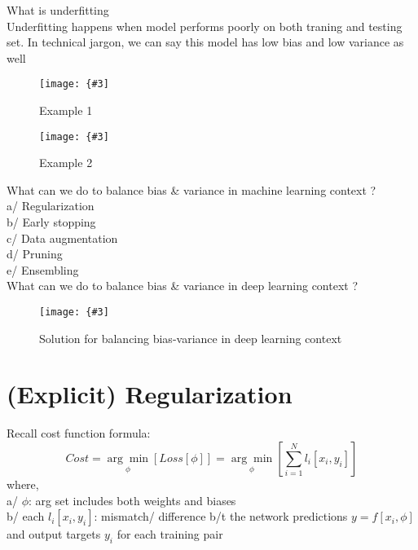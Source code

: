 \documentclass[12pt,a4paper]{article}
\newcommand{\img}[3]{
	\texttt{[image: \{\#3]}}}
\begin{document}
\noindent What is underfitting\\
\indent Underfitting happens when model performs poorly on both traning and testing set. In technical jargon, we can say this model has low bias and low variance as well\\
\begin{figure}[!h]
	\centering
	\begin{minipage}[h!]{0.4\textwidth}
		\img{\textwidth}{\textwidth}{Picture/Bias-Variance/2.png}
		\caption{Example 1}
	\end{minipage}
	\hfill
	\begin{minipage}[h!]{0.4\textwidth}
		\img{\textwidth}{\textwidth}{Picture/Bias-Variance/3.png}
		\caption{Example 2}
	\end{minipage}
\end{figure}
\newline
\noindent What can we do to balance bias \& variance in machine learning context ?\\
\indent a/ Regularization\\
\indent b/ Early stopping\\
\indent c/ Data augmentation\\
\indent d/ Pruning\\
\indent e/ Ensembling\\

\noindent What can we do to balance bias \& variance in deep learning context ?\\
\begin{figure}[h!]
\centering\img{4cm}{4cm}{Picture/Bias-Variance/4.jpg}
\caption{Solution for balancing bias-variance in deep learning context}
\end{figure}


\section{(Explicit) Regularization}
Recall cost function formula:
\begin{equation}
Cost = \underset{\phi}{\arg\min}[Loss[\phi]]
= \underset{\phi}{\arg\min}\left[\sum_{i=1}^{N}{l_{i}[x_i, y_i]}\right]
\end{equation}
where,\\
\indent a/ $\phi$: arg set includes both weights and biases\\
\indent b/ each $l_i[x_i, y_i]$: mismatch/ difference b/t the network predictions $y=f[x_i , \phi]$ and output targets $y_i$ for each training pair\\
\end{document}
